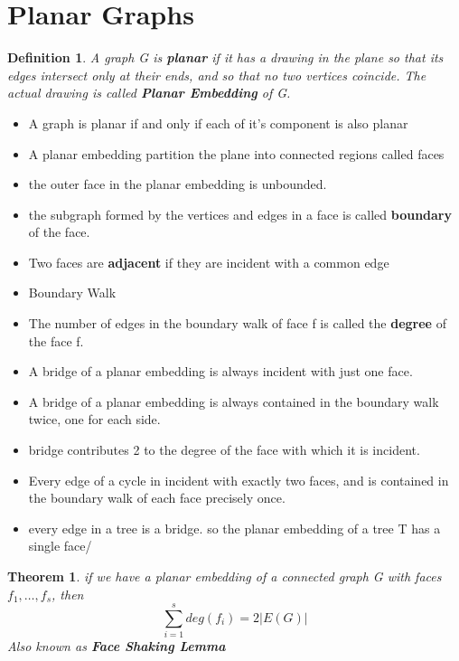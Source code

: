 \documentclass[10pt, a4paper]{article}
\newtheorem*{thm}{Theorem}
\newtheorem*{defn}{Definition}
\begin{document}
\section{Planar Graphs}
\begin{defn}
    A graph G is \textbf{planar} if it has a drawing in the plane so that its edges intersect only at their ends, and so that no two vertices coincide. The actual drawing is called \textbf{Planar Embedding} of G.
\end{defn}
\begin{term}
    \begin{itemize}
        \item A graph is planar if and only if each of it's component is also planar
        \item A planar embedding partition the plane into connected regions called faces
        \item the outer face in the planar embedding is unbounded.
        \item the subgraph formed by the vertices and edges in a face is called \textbf{boundary} of the face.
        \item Two faces are \textbf{adjacent} if they are incident with a common edge
        \item Boundary Walk
        \item The number of edges in the boundary walk of face f is called the \textbf{degree} of the face f.
        \item A bridge of a planar embedding is always incident with just one face.
        \item A bridge of a planar embedding is always contained in the boundary walk twice, one for each side.
        \item bridge contributes 2 to the degree of the face with which it is incident.
        \item Every edge of a cycle in incident with exactly two faces, and is contained in the boundary walk of each face precisely once.
        \item every edge in a tree is a bridge. so the planar embedding of a tree T has a single face/
        \end{itemize}
\end{term}

\begin{thm}
    if we have a planar embedding of a connected graph G with faces $f_1, \dots, f_s$, then
    \[\sum_{i = 1}^{s}deg(f_i) = 2|E(G)|\]
    Also known as \textbf{Face Shaking Lemma}
\end{thm}
\end{document}

